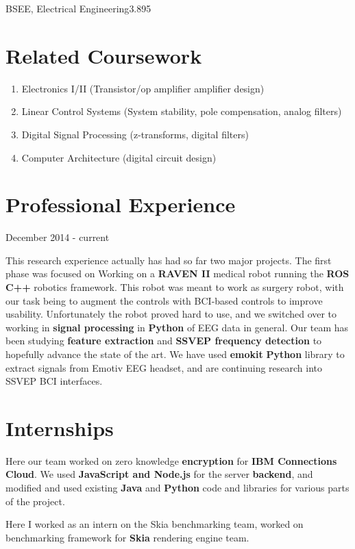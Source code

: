 \documentclass{my_resume}
\begin{document}

	{BSEE, Electrical Engineering}{3.895}
\section{Related Coursework}
\begin{enumerate}
    \item Electronics I/II (Transistor/op amplifier amplifier design)
    \item Linear Control Systems (System stability, pole compensation, analog filters)
    \item Digital Signal Processing (z-transforms, digital filters)
    \item Computer Architecture (digital circuit design)
\end{enumerate}

\section{Professional Experience}
	{December 2014 - current}
\begin{flushleft}
This research experience actually has had so far two major projects. The first
phase was focused on Working on a \textbf{RAVEN II} medical robot running the
\textbf{ROS C++} robotics framework. This robot was meant to work as surgery
robot, with our task being to augment the controls with BCI-based controls to
improve usability. Unfortunately the robot proved hard to use, and we switched
over to working in \textbf{signal processing} in \textbf{Python} of EEG data in
general. Our team has been studying \textbf{feature extraction} and
\textbf{SSVEP frequency detection} to hopefully advance the state of the art.
We have used \textbf{emokit} \textbf{Python} library to extract signals from
Emotiv EEG headset, and are continuing research into SSVEP BCI interfaces.
\end{flushleft}
\section{Internships}
\begin{flushleft}
Here our team worked on zero knowledge \textbf{encryption} for 
\textbf{IBM Connections Cloud}. We used \textbf{JavaScript and Node.js} for the
server \textbf{backend}, and
modified and used existing \textbf{Java} and \textbf{Python} code and libraries
for various parts of the project.
\end{flushleft}
\begin{flushleft}
Here I worked as an intern on the Skia benchmarking team, worked on benchmarking
framework for \textbf{Skia} rendering engine team.
\end{flushleft}
\end{document}

